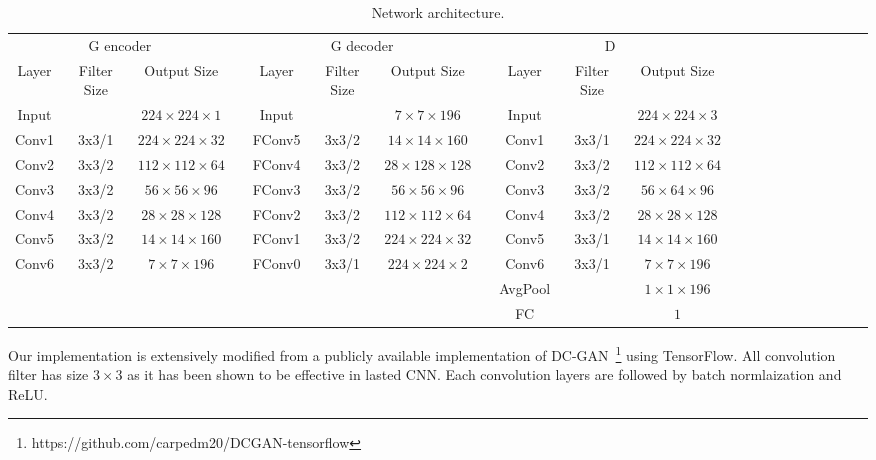 \documentclass[10pt,twocolumn,letterpaper]{article}
\begin{document}
\begin{table}[t!]
\caption{\small Network architecture.}
\label{tab:network}
\begin{center}
\small
\begin{tabular}{ @{}ccccccccccccccccccccc@{} }
\toprule
\multicolumn{3}{c}{G encoder} & \hspace{2mm} 
& \multicolumn{3}{c}{G decoder} & \hspace{2mm} 
& \multicolumn{3}{c}{D} \\
\cmidrule(r){1-3}
\cmidrule(r){5-7}
\cmidrule(r){9-11}

Layer & Filter Size & Output Size && Layer & Filter Size & Output Size && Layer & Filter Size & Output Size \\ \midrule
Input  &       & $224\times224\times1$  && Input  &       & $7\times7\times196$  && Input  &       & $224\times224\times3$ \\ \midrule
Conv1 & 3x3/1 & $224\times224\times32$ && FConv5 & 3x3/2 & $14\times14\times160$ && Conv1 & 3x3/1 & $224\times224\times32$ && \\
Conv2 & 3x3/2 & $112\times112\times64$ && FConv4 & 3x3/2 & $28\times128\times128$ && Conv2 & 3x3/2 & $112\times112\times64$ && \\

Conv3 & 3x3/2 & $56\times56\times96$ && FConv3 & 3x3/2 & $56\times56\times96$ &&Conv3 & 3x3/2 & $56\times64\times96$ && \\
Conv4 & 3x3/2 & $28\times28\times128$ && FConv2 & 3x3/2 & $112\times112\times64$ &&Conv4 & 3x3/2 & $28\times28\times128$ && \\

Conv5 & 3x3/2 & $14\times14\times160$ && FConv1 & 3x3/2 & $224\times224\times32$ &&Conv5 & 3x3/1 & $14\times14\times160$ &&\\
Conv6 & 3x3/2 & $7\times7\times196$ && FConv0 & 3x3/1 & $224\times224\times2$ &&Conv6 & 3x3/1 & $7\times7\times196$ && \\   \midrule

&&&&&&&& AvgPool     &       & $1\times 1 \times 196$ \\
&&&&&&&& FC          &       & $1$ \\ \bottomrule
\end{tabular}%
\end{center}
\end{table}

Our implementation is extensively modified from a publicly available implementation of DC-GAN~\footnote{https://github.com/carpedm20/DCGAN-tensorflow} using TensorFlow. All convolution filter has size $3 \times 3$ as it has been shown to be effective in lasted CNN. Each convolution layers are followed by batch normlaization and ReLU.
\end{document}
